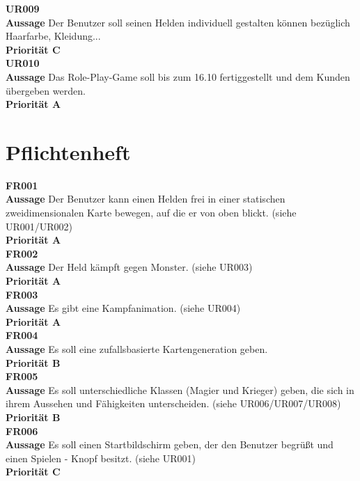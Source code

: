 \textbf{UR009} \\
\textbf{Aussage} Der Benutzer soll seinen Helden individuell gestalten können bezüglich Haarfarbe, Kleidung... \\
\textbf{Priorität C} \\

\textbf{UR010} \\
\textbf{Aussage} Das Role-Play-Game soll bis zum 16.10 fertiggestellt und dem Kunden übergeben werden.\\
\textbf{Priorität A}

\newpage

\section{Pflichtenheft}
\label{Pflichtenheft}

\textbf{FR001} \\
\textbf{Aussage} Der Benutzer kann einen Helden frei in einer statischen zweidimensionalen Karte bewegen, auf die er von oben blickt. (siehe UR001/UR002) \\
\textbf{Priorität A} \\

\textbf{FR002} \\
\textbf{Aussage} Der Held kämpft gegen Monster. (siehe UR003) \\
\textbf{Priorität A} \\

\textbf{FR003} \\
\textbf{Aussage} Es gibt eine Kampfanimation. (siehe UR004) \\
\textbf{Priorität A} \\

\textbf{FR004} \\
\textbf{Aussage} Es soll eine zufallsbasierte Kartengeneration geben. \\
\textbf{Priorität B} \\

\textbf{FR005} \\
\textbf{Aussage} Es soll unterschiedliche Klassen (Magier und Krieger) geben, die sich in ihrem Aussehen und Fähigkeiten unterscheiden. (siehe UR006/UR007/UR008) \\
\textbf{Priorität B} \\

\textbf{FR006} \\
\textbf{Aussage} Es soll einen Startbildschirm geben, der den Benutzer begrüßt und einen \glqq{}Spielen\grqq{} - Knopf besitzt. (siehe UR001) \\
\textbf{Priorität C} \\

